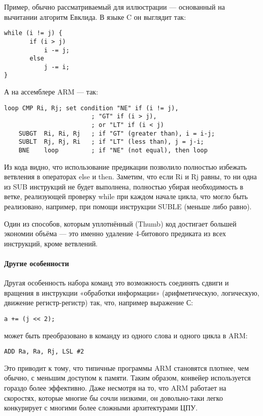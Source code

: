 Пример, обычно рассматриваемый для иллюстрации — основанный на вычитании 
алгоритм Евклида. В языке C он выглядит так:

\begin{lstlisting}[style=cpp,title={алгоритм Евклида}]
while (i != j) {
       if (i > j)
           i -= j;
       else
           j -= i;
}
\end{lstlisting}

А на ассемблере ARM — так:

\begin{lstlisting}[style=asm]
loop CMP Ri, Rj; set condition "NE" if (i != j),
						; "GT" if (i > j),
						; or "LT" if (i < j)
	SUBGT  Ri, Ri, Rj   ; if "GT" (greater than), i = i-j;
	SUBLT  Rj, Rj, Ri   ; if "LT" (less than), j = j-i;
	BNE    loop         ; if "NE" (not equal), then loop
\end{lstlisting}

Из кода видно, что использование предикации позволило полностью избежать 
ветвления в операторах else и then. Заметим, что если Ri и Rj равны, то ни 
одна из SUB инструкций не будет выполнена, полностью убирая необходимость в 
ветке, реализующей проверку while при каждом начале цикла, что могло быть 
реализовано, например, при помощи инструкции SUBLE (меньше либо равно).

Один из способов, которым уплотнённый (Thumb) код достигает большей экономии 
объёма — это именно удаление 4-битового предиката из всех инструкций, кроме 
ветвлений.

\paragraph{Другие особенности}

Другая особенность набора команд это возможность соединять сдвиги и вращения 
в инструкции «обработки информации» (арифметическую, логическую, движение 
регистр-регистр) так, что, например выражение С:
\begin{lstlisting}[style=cpp]
a += (j << 2);
\end{lstlisting}

может быть преобразовано в команду из одного слова и одного цикла в ARM:

\begin{lstlisting}[style=asm]
ADD Ra, Ra, Rj, LSL #2
\end{lstlisting}

Это приводит к тому, что типичные программы ARM становятся плотнее, чем 
обычно, с меньшим доступом к памяти. Таким образом, конвейер используется 
гораздо более эффективно. Даже несмотря на то, что ARM работает на скоростях, 
которые многие бы сочли низкими, он довольно-таки легко конкурирует с 
многими более сложными архитектурами ЦПУ.

